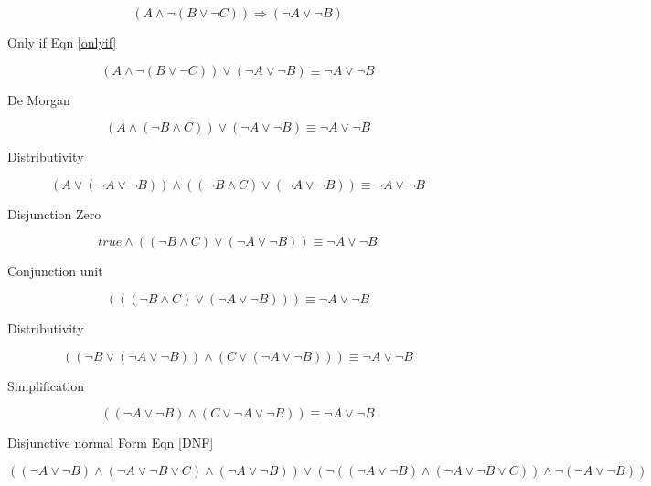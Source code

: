 \documentclass[10pt,a4paper]{article}
\begin{document}
\begin{equation}
 (A \wedge \neg(B\vee \neg C)) \Rightarrow  (\neg A\vee \neg B)
\end{equation}

Only if Eqn \ref{onlyif}

\begin{equation}
(A \wedge \neg(B \vee \neg C)) \vee (\neg A \vee \neg B) \equiv \neg A \vee \neg B 
\end{equation}

De Morgan

\begin{equation}
 (A \wedge(\neg B \wedge C)) \vee (\neg A \vee \neg B) \equiv \neg A \vee \neg B 
\end{equation}

Distributivity

\begin{equation}
(A \vee (\neg A \vee\neg B))\wedge((\neg B \wedge C) \vee (\neg A \vee \neg B)) \equiv \neg A \vee \neg B
\end{equation}

Disjunction Zero

\begin{equation}
true \wedge((\neg B \wedge C) \vee (\neg A \vee \neg B)) \equiv \neg A \vee \neg B
\end{equation}

Conjunction unit

\begin{equation}
(((\neg B \wedge C) \vee (\neg A \vee \neg B))) \equiv \neg A \vee \neg B
\end{equation}

Distributivity

\begin{equation}
((\neg B \vee (\neg A \vee \neg B ))\wedge(C \vee (\neg A \vee \neg B))) \equiv \neg A \vee \neg B
\end{equation}

Simplification

\begin{equation}
((\neg A \vee \neg B )\wedge(C \vee \neg A \vee \neg B)) \equiv \neg A \vee \neg B
\end{equation}

Disjunctive normal Form Eqn \ref{DNF}

\begin{equation}
 ((\neg A \vee \neg B) \wedge(\neg A\vee\neg B\vee C) \wedge(\neg A\vee\neg B)) \vee (\neg ((\neg A\vee \neg B)\wedge(\neg A\vee\neg B\vee C))\wedge\neg(\neg A\vee \neg B))
\end{equation}
\end{document}
